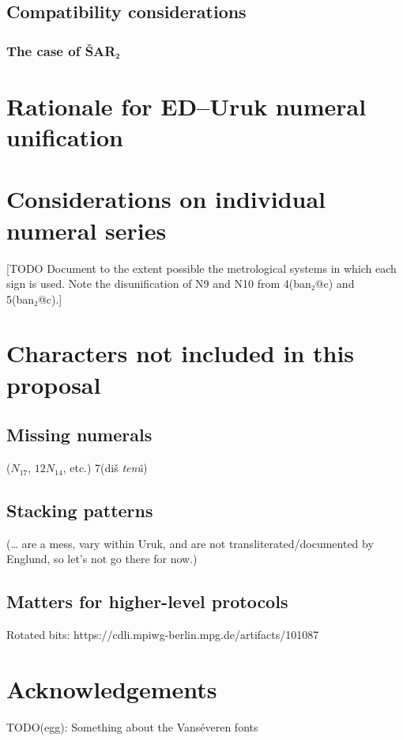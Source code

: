 \documentclass[10pt, a4paper, twoside]{article}
\begin{document}
\subsection{Compatibility considerations}
\label{compatibility}

\subsubsection{The case of ŠAR₂}


\section{Rationale for ED–Uruk numeral unification}
\label{unificationRationale}

\section{Considerations on individual numeral series}

[TODO Document to the extent possible the metrological systems in which each sign is used.
Note the disunification of N9 and N10 from 4(ban₂@c) and 5(ban₂@c).]

\section{Characters not included in this proposal}
\subsection{Missing numerals}
($N_{17}$, $12N_{14}$, etc.) 7(diš \emph{tenû})
\subsection{Stacking patterns}
\label{stackingPatterns}
(… are a mess, vary within Uruk, and are not transliterated/documented by Englund, so let’s not go there for now.)
\subsection{Matters for higher-level protocols}
Rotated bits:
https://cdli.mpiwg-berlin.mpg.de/artifacts/101087

\section{Acknowledgements}

TODO(egg): Something about the Vanséveren fonts

\printbibliography
\end{document}
